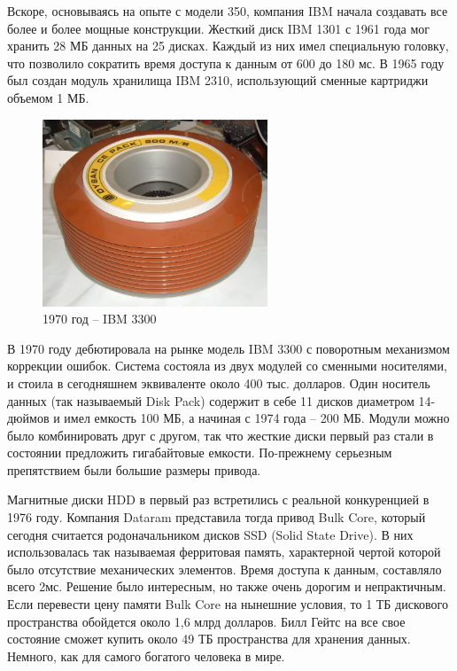 \documentclass[bachelor, och, referat]{SCWorks}
\begin{document}
Вскоре, основываясь на опыте с модели 350, компания IBM начала создавать все 
более и более мощные конструкции. Жесткий диск IBM 1301 с 1961 года мог хранить 
28 МБ данных на 25 дисках. Каждый из них имел специальную головку, что позволило 
сократить время доступа к данным от 600 до 180 мс. В 1965 году был создан модуль 
хранилища IBM 2310, использующий сменные картриджи объемом 1 МБ.

\begin{figure}[H]
    \centering
    \includegraphics[width=0.6\textwidth]{ibm3300.png}
    \caption{1970 год -- IBM 3300}
    \label{}
\end{figure}

В 1970 году дебютировала на рынке модель IBM 3300 с поворотным механизмом 
коррекции ошибок. Система состояла из двух модулей со сменными носителями, и 
стоила в сегодняшнем эквиваленте около 400 тыс. долларов. Один носитель данных 
(так называемый Disk Pack) содержит в себе 11 дисков диаметром 14-дюймов и имел 
емкость 100 МБ, а начиная с 1974 года – 200 МБ. Модули можно было комбинировать 
друг с другом, так что жесткие диски первый раз стали в состоянии предложить 
гигабайтовые емкости. По-прежнему серьезным препятствием были 
большие размеры привода.

Магнитные диски HDD в первый раз встретились с реальной конкуренцией в 1976 
году. Компания Dataram представила тогда привод Bulk Core, который сегодня 
считается родоначальником дисков SSD (Solid State Drive). В них использовалась 
так называемая ферритовая память, характерной чертой которой было отсутствие 
механических элементов. Время доступа к данным, составляло всего 2мс. Решение 
было интересным, но также очень дорогим и непрактичным. Если перевести цену 
памяти Bulk Core на нынешние условия, то 1 ТБ дискового пространства обойдется 
около 1,6 млрд долларов. Билл Гейтс на все свое состояние сможет купить около 
49 ТБ пространства для хранения данных. Немного, как для самого богатого 
человека в мире.
\end{document}
